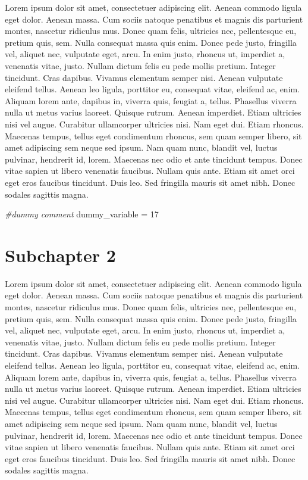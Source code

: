 \documentclass[]{book}
\newenvironment{Shaded}{\begin{snugshade}}{\end{snugshade}}
\newcommand{\DecValTok}[1]{\textcolor[rgb]{0.00,0.00,0.81}{#1}}
\newcommand{\StringTok}[1]{\textcolor[rgb]{0.31,0.60,0.02}{#1}}
\newcommand{\CommentTok}[1]{\textcolor[rgb]{0.56,0.35,0.01}{\textit{#1}}}
\newcommand{\NormalTok}[1]{#1}
\begin{document}
Lorem ipsum dolor sit amet, consectetuer adipiscing elit. Aenean commodo
ligula eget dolor. Aenean massa. Cum sociis natoque penatibus et magnis
dis parturient montes, nascetur ridiculus mus. Donec quam felis,
ultricies nec, pellentesque eu, pretium quis, sem. Nulla consequat massa
quis enim. Donec pede justo, fringilla vel, aliquet nec, vulputate eget,
arcu. In enim justo, rhoncus ut, imperdiet a, venenatis vitae, justo.
Nullam dictum felis eu pede mollis pretium. Integer tincidunt. Cras
dapibus. Vivamus elementum semper nisi. Aenean vulputate eleifend
tellus. Aenean leo ligula, porttitor eu, consequat vitae, eleifend ac,
enim. Aliquam lorem ante, dapibus in, viverra quis, feugiat a, tellus.
Phasellus viverra nulla ut metus varius laoreet. Quisque rutrum. Aenean
imperdiet. Etiam ultricies nisi vel augue. Curabitur ullamcorper
ultricies nisi. Nam eget dui. Etiam rhoncus. Maecenas tempus, tellus
eget condimentum rhoncus, sem quam semper libero, sit amet adipiscing
sem neque sed ipsum. Nam quam nunc, blandit vel, luctus pulvinar,
hendrerit id, lorem. Maecenas nec odio et ante tincidunt tempus. Donec
vitae sapien ut libero venenatis faucibus. Nullam quis ante. Etiam sit
amet orci eget eros faucibus tincidunt. Duis leo. Sed fringilla mauris
sit amet nibh. Donec sodales sagittis magna.

\begin{Shaded}
\begin{Highlighting}[]
\CommentTok{#dummy comment}
\NormalTok{dummy_variable =}\StringTok{ }\DecValTok{17}
\end{Highlighting}
\end{Shaded}

\section{Subchapter 2}\label{subchapter-2-1}

Lorem ipsum dolor sit amet, consectetuer adipiscing elit. Aenean commodo
ligula eget dolor. Aenean massa. Cum sociis natoque penatibus et magnis
dis parturient montes, nascetur ridiculus mus. Donec quam felis,
ultricies nec, pellentesque eu, pretium quis, sem. Nulla consequat massa
quis enim. Donec pede justo, fringilla vel, aliquet nec, vulputate eget,
arcu. In enim justo, rhoncus ut, imperdiet a, venenatis vitae, justo.
Nullam dictum felis eu pede mollis pretium. Integer tincidunt. Cras
dapibus. Vivamus elementum semper nisi. Aenean vulputate eleifend
tellus. Aenean leo ligula, porttitor eu, consequat vitae, eleifend ac,
enim. Aliquam lorem ante, dapibus in, viverra quis, feugiat a, tellus.
Phasellus viverra nulla ut metus varius laoreet. Quisque rutrum. Aenean
imperdiet. Etiam ultricies nisi vel augue. Curabitur ullamcorper
ultricies nisi. Nam eget dui. Etiam rhoncus. Maecenas tempus, tellus
eget condimentum rhoncus, sem quam semper libero, sit amet adipiscing
sem neque sed ipsum. Nam quam nunc, blandit vel, luctus pulvinar,
hendrerit id, lorem. Maecenas nec odio et ante tincidunt tempus. Donec
vitae sapien ut libero venenatis faucibus. Nullam quis ante. Etiam sit
amet orci eget eros faucibus tincidunt. Duis leo. Sed fringilla mauris
sit amet nibh. Donec sodales sagittis magna.
\end{document}
